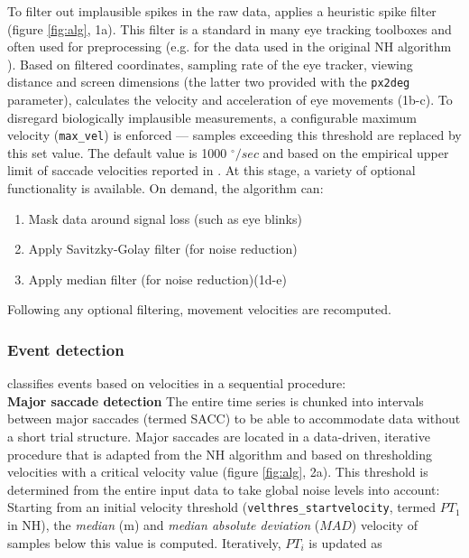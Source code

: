     To filter out implausible spikes in the raw data, \remodnav applies a heuristic spike filter \citep{stampe1993}
    (figure \ref{fig:alg}, 1a). This filter is a standard in many eye tracking toolboxes and often used for preprocessing
    (e.g. for the data used in the original NH algorithm \citep{Friedman2018}). Based on filtered coordinates, sampling
    rate of the eye tracker, viewing distance and screen dimensions (the latter two provided with the \texttt{px2deg}
    parameter), \remodnav calculates the velocity and acceleration of eye movements (1b-c). To disregard biologically
    implausible measurements, a configurable maximum velocity (\texttt{max\_vel}) is enforced --- samples exceeding this
    threshold are replaced by this set value. The default value is 1000 $^\circ/sec$ and based on the empirical upper
    limit of saccade velocities reported in \cite{holmqvist2011eye}.
    At this stage, a variety of optional functionality is available. On demand, the algorithm can:
    \begin{enumerate}
        \item Mask data around signal loss (such as eye blinks)
        \item Apply Savitzky-Golay filter (for noise reduction)
        \item Apply median filter (for noise reduction)(1d-e)
    \end{enumerate}
    Following any optional filtering, movement velocities are recomputed.\\

    \subsubsection*{Event detection}
    \remodnav classifies events based on velocities in a sequential procedure: \\
    \textbf{Major saccade detection} The entire time series is chunked into intervals between major saccades (termed
    SACC) to be able to accommodate data without a short trial structure. Major saccades are located in a data-driven,
    iterative procedure that is adapted from the NH algorithm and based on thresholding velocities with a critical
    velocity value (figure \ref{fig:alg}, 2a). This threshold is determined from the entire input data to take global
    noise levels into account: Starting from an initial velocity threshold (\texttt{velthres\_startvelocity}, termed
    $PT_1$ in NH), the \textit{median} (m) and \textit{median absolute deviation} ($MAD$) velocity of samples below this
    value is computed. Iteratively, $PT_i$ is updated as

